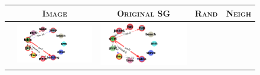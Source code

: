 \begin{figure}[t]
\begin{tabular}{p{0.25cm}c|c|c|c}
		& \textsc{\textbf{Image}} & \textbf{\textsc{Original SG}} & \textbf{\textsc{Rand}} & \textbf{\textsc{Neigh}}\Bstrut\\
		\toprule %
		\multicolumn{1}{c|}{\rotatebox[origin=c]{90}{\textbf{\structn}}} & \includegraphics[align=c,width=\width,trim={2cm 0.1cm 7cm 0.1cm},clip]{2350517_structn_L0_5_topk5_a2_graph_13.png} & 
		\includegraphics[align=c,width=\width,trim={2cm 0.1cm 7cm 0.1cm},clip]{2350517_structn_L0_5_topk5_a5_graph_3.png} & 

\end{tabular}
\end{figure}
